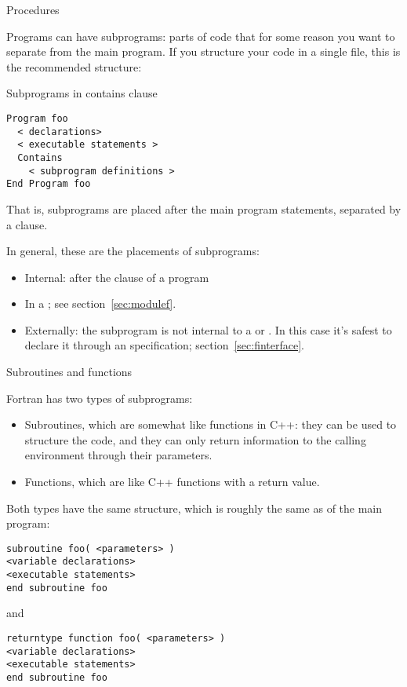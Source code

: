 
 {Procedures}

Programs can have subprograms: parts of code that for some reason you
want to separate from the main program. If you structure your code in a single
file, this is the recommended structure:

\begin{block}{Subprograms in contains clause}
  \label{sl:contains}
\begin{lstlisting}
Program foo
  < declarations>
  < executable statements >
  Contains
    < subprogram definitions >
End Program foo
\end{lstlisting}
\end{block}

That is, subprograms are placed after the main program statements,
separated by a  clause.

In general, these are the  placements of subprograms:
\begin{itemize}
\item Internal: after the  clause of a program
\item In a ; see section~\ref{sec:modulef}.
\item Externally: the subprogram is not internal to a  or
  . In this case it's safest to declare it through an
   specification; section~\ref{sec:finterface}.
\end{itemize}
 {Subroutines and functions}

Fortran has two types of subprograms:
\begin{itemize}
\item Subroutines, which are somewhat like  functions in C++:
  they can be used to structure the code, and they can only return
  information to the calling environment through their parameters.
\item Functions, which are like C++ functions with a return value.
\end{itemize}

Both types have the same structure, which is roughly the same as of
the main program:
\begin{lstlisting}
subroutine foo( <parameters> )
<variable declarations>
<executable statements>
end subroutine foo
\end{lstlisting}
and
\begin{lstlisting}
returntype function foo( <parameters> )
<variable declarations>
<executable statements>
end subroutine foo
\end{lstlisting}

